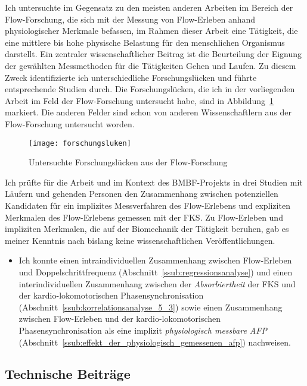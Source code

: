 Ich untersuchte im Gegensatz zu den meisten anderen Arbeiten im Bereich der Flow-Forschung, die sich mit der Messung von Flow-Erleben anhand physiologischer Merkmale befassen, im Rahmen dieser Arbeit eine Tätigkeit, die eine mittlere bis hohe physische Belastung für den menschlichen Organismus darstellt. Ein zentraler wissenschaftlicher Beitrag ist die Beurteilung der Eignung der gewählten Messmethoden für die Tätigkeiten Gehen und Laufen. Zu diesem Zweck identifizierte ich unterschiedliche Forschungslücken und führte entsprechende Studien durch. Die Forschungslücken, die ich in der vorliegenden Arbeit im Feld der Flow-Forschung untersucht habe, sind in Abbildung~\ref{fig:forschungsluken} markiert. Die anderen Felder sind schon von anderen Wissenschaftlern aus der Flow-Forschung untersucht worden. 
\begin{figure}
	[!htb] \centering 
	\texttt{[image: forschungsluken]} \caption[Untersuchte Forschungslücken aus der Flow-Forschung]{Untersuchte Forschungslücken aus der Flow-Forschung} \label{fig:forschungsluken} 
\end{figure}

Ich prüfte für die Arbeit und im Kontext des \acs{BMBF}-Projekts in drei Studien mit Läufern und gehenden Personen den Zusammenhang zwischen potenziellen Kandidaten für ein implizites Messverfahren des Flow-Erlebens und expliziten Merkmalen des Flow-Erlebens gemessen mit der \ac{FKS}. Zu Flow-Erleben und impliziten Merkmalen, die auf der Biomechanik der Tätigkeit beruhen, gab es meiner Kenntnis nach bislang keine wissenschaftlichen Veröffentlichungen. 
\begin{itemize}
	
	\item Ich konnte einen intraindividuellen Zusammenhang zwischen Flow-Erleben und Doppelschrittfrequenz (Abschnitt~\ref{ssub:regressionsanalyse}) und einen interindividuellen Zusammenhang zwischen der \emph{Absorbiertheit} der \ac{FKS} und der kardio-lokomotorischen Phasensynchronisation (Abschnitt~\ref{ssub:korrelationsanalyse_5_3}) sowie einen Zusammenhang zwischen Flow-Erleben und der kardio-lokomotorischen Phasensynchronisation als eine implizit \emph{physiologisch messbare \ac{AFP}} (Abschnitt~\ref{ssub:effekt_der_physiologisch_gemessenen_afp}) nachweisen.  
	
\end{itemize}

\subsection{Technische Beiträge} 

